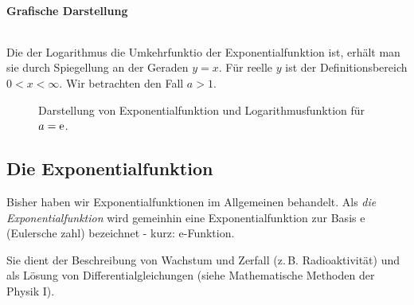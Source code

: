 \newpage
\paragraph{Grafische Darstellung}$~$

Die der Logarithmus die Umkehrfunktio der Exponentialfunktion ist, erhält man sie durch Spiegellung an der Geraden $y=x$. Für reelle $y$ ist der Definitionsbereich $0 < x < \infty$. Wir betrachten den Fall $a > 1$.
\begin{figure}[htp]
    \centering
    \caption{Darstellung von Exponentialfunktion und Logarithmusfunktion für $a = \mathrm{e}$.}
    \label{}
\end{figure}


\subsection{Die Exponentialfunktion}
Bisher haben wir Exponentialfunktionen im Allgemeinen behandelt. Als \emph{die Exponentialfunktion} wird gemeinhin eine Exponentialfunktion zur Basis e (Eulersche zahl) bezeichnet - kurz: e-Funktion.

Sie dient der Beschreibung von Wachstum und Zerfall (z.\,B. Radioaktivität) und als Lösung von Differentialgleichungen (siehe Mathematische Methoden der Physik I).

